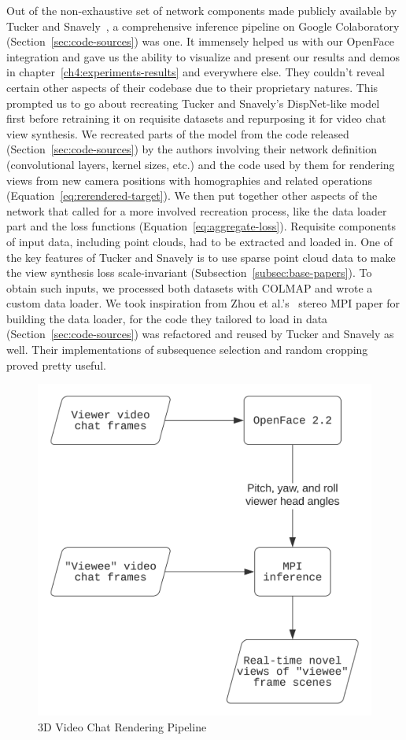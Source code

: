 Out of the non-exhaustive set of network components made publicly available by Tucker and Snavely~\cite{single_view_mpi}, a comprehensive inference pipeline on Google Colaboratory (Section~\ref{sec:code-sources}) was one. It immensely helped us with our OpenFace integration and gave us the ability to visualize and present our results and demos in chapter~\ref{ch4:experiments-results} and everywhere else. They couldn't reveal certain other aspects of their codebase due to their proprietary natures. This prompted us to go about recreating Tucker and Snavely's DispNet-like model~\cite{mayer_large_2016} first before retraining it on requisite datasets and repurposing it for video chat view synthesis. We recreated parts of the model from the code released (Section~\ref{sec:code-sources}) by the authors involving their network definition (convolutional layers, kernel sizes, etc.) and the code used by them for rendering views from new camera positions with homographies and related operations (Equation~\ref{eq:rerendered-target}). We then put together other aspects of the network that called for a more involved recreation process, like the data loader part and the loss functions (Equation~\ref{eq:aggregate-loss}). Requisite components of input data, including point clouds, had to be extracted and loaded in. One of the key features of Tucker and Snavely is to use sparse point cloud data to make the view synthesis loss scale-invariant (Subsection~\ref{subsec:base-papers}). To obtain such inputs, we processed both datasets with COLMAP and wrote a custom data loader. We took inspiration from Zhou et al.'s~\cite{zhou2018stereo} stereo MPI paper for building the data loader, for the code they tailored to load in data (Section~\ref{sec:code-sources}) was refactored and reused by Tucker and Snavely as well. Their implementations of subsequence selection and random cropping proved pretty useful.

\begin{figure}[!h]
    \includegraphics[width=0.60\columnwidth]{figures/3d-video-chat-rendering-pipeline.png}
    \caption{3D Video Chat Rendering Pipeline}
    \label{fig:3d-video-chat-rendering-pipeline}
\end{figure}

